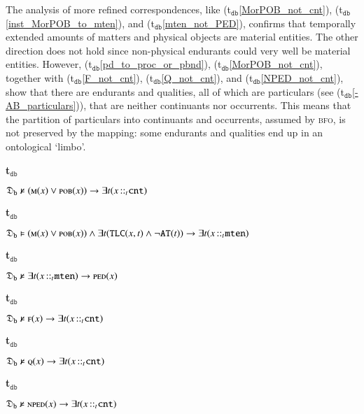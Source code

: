 \documentclass[ao]{iosart2x}
\newcommand{\bflist}{\begin{list}{}{\setlength{\topsep}{2mm}\setlength{\parsep}{0mm}\setlength{\leftmargin}{9.2mm}\setlength{\labelwidth}{8mm}}}
\newcommand{\eflist}{\end{list}}
\newcommand{\dbThrLabel}{\textrm{t$_\texttt{db}$}}
\newcounter{cntdbth}
\newcommand{\dbth}[1]{\refstepcounter{cntdbth}\begin{small}{\bf \dbThrLabel\thecntdbth\label{#1}}\end{small}}
\newcommand{\refdbth}[1]{({\dbThrLabel}\ref{#1})}
\newcommand{\pr}[1]{\mathtt{#1}}
\newcommand{\cn}[1]{\mathtt{#1}}
\newcommand{\bfo}{{\textsc{bfo}}}
\newcommand {\thdolcedbmap} {\ensuremath{\mathfrak{D}_\texttt{b}}}
\newcommand {\Mdcat} {\textsc{m}}
\newcommand {\Fdcat} {\textsc{f}}
\newcommand {\NPEDdcat} {\textsc{nped}}
\newcommand {\PEDdcat} {\textsc{ped}}
\newcommand {\POBdcat} {\textsc{pob}}
\newcommand {\Qdcat} {\textsc{q}}
\newcommand {\ATd} {\ensuremath{\pr{AT}}}
\newcommand {\TLCd} {\ensuremath{\pr{TLC}}}
\newcommand{\cntbcat}{\cn{cnt}}
\newcommand{\mtenbcat}{\cn{mten}}
\newcommand{\bfoiof}[1]{{\,::_{#1\:\!}}}
\begin{document}
The analysis of more refined correspondences, like \refdbth{MorPOB_not_cnt}, \refdbth{inst_MorPOB_to_mten}, and \refdbth{mten_not_PED}, confirms that temporally extended amounts of matters and physical objects are material entities. The other direction does not hold since non-physical endurants could very well be material entities. However,  \refdbth{pd_to_proc_or_pbnd}, \refdbth{MorPOB_not_cnt}, together with \refdbth{F_not_cnt}, \refdbth{Q_not_cnt}, and \refdbth{NPED_not_cnt}, show that there are endurants and qualities, all of which are particulars (see \refdbth{-AB_particulars}), that are neither continuants nor occurrents. This means that the partition of particulars into continuants and occurrents, assumed by {\bfo}, is not preserved by the mapping: some endurants and qualities end up in an ontological `limbo'. 
%
\bflist
\item[\dbth{MorPOB_not_cnt}] $\thdolcedbmap \nvDash (\Mdcat(x) \lor \POBdcat(x)) \to \exists t(x \bfoiof{t} \cntbcat)$

\item[\dbth{inst_MorPOB_to_mten}] $\thdolcedbmap \vDash (\Mdcat(x) \lor \POBdcat(x)) \land \exists t(\TLCd(x,t) \land \neg \ATd(t)) \to \exists t(x \bfoiof{t} \mtenbcat)$

\item[\dbth{mten_not_PED}] $\thdolcedbmap \nvDash \exists t(x \bfoiof{t} \mtenbcat) \to \PEDdcat(x)$

\item[\dbth{F_not_cnt}] $\thdolcedbmap \nvDash \Fdcat(x) \to \exists t(x \bfoiof{t} \cntbcat)$

\item[\dbth{Q_not_cnt}] $\thdolcedbmap \nvDash \Qdcat(x) \to \exists t(x \bfoiof{t} \cntbcat)$

\item[\dbth{NPED_not_cnt}] $\thdolcedbmap \nvDash \NPEDdcat(x) \to \exists t(x \bfoiof{t} \cntbcat)$
\eflist
\end{document}
